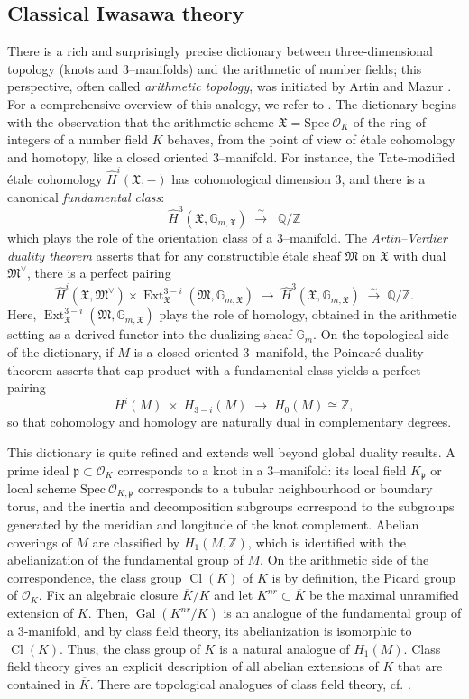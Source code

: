 \documentclass[table]{amsart}
\newcommand{\Z}{\mathbb{Z}}
\newcommand{\Q}{\mathbb{Q}}
\newcommand{\cO}{\mathcal{O}}
\newcommand{\Spec}{\mathrm{Spec}\ }
\newcommand{\op}[1]{\operatorname{#1}}
\numberwithin{equation}{section}
\begin{document}
\subsection{Classical Iwasawa theory}
There is a rich and surprisingly precise dictionary between three-dimensional topology (knots and $3$--manifolds) and the arithmetic of number fields; this perspective, often called \emph{arithmetic topology}, was initiated by Artin and Mazur \cite{ArtinMazur}. For a comprehensive overview of this analogy, we refer to \cite{morishita2011knots}. The dictionary begins with the observation that the arithmetic scheme $\mathfrak{X}=\Spec\cO_K$ of the ring of integers of a number field $K$ behaves, from the point of view of \'etale cohomology and homotopy, like a closed oriented $3$--manifold. For instance, the Tate-modified \'etale cohomology $\hat{H}^i(\mathfrak{X},-)$ has cohomological dimension $3$, and there is a canonical \emph{fundamental class}:
\[
\hat{H}^3(\mathfrak{X},\mathbb{G}_{m,\mathfrak X}) \;\xrightarrow{\;\sim\;}\;\; \Q/\Z
\]
which plays the role of the orientation class of a $3$--manifold. The \emph{Artin--Verdier duality theorem} asserts that for any constructible \'etale sheaf $\mathfrak M$ on $\mathfrak X$ with dual $\mathfrak M^\vee$, there is a perfect pairing
\[
\hat{H}^i(\mathfrak{X}, \mathfrak{M}^\vee)\times \op{Ext}_{\mathfrak{X}}^{3-i}(\mathfrak{M}, \mathbb{G}_{m, \mathfrak{X}})\;\longrightarrow\; \hat{H}^3(\mathfrak{X}, \mathbb{G}_{m, \mathfrak{X}})\;\xrightarrow{\sim}\;\Q/\Z.
\]
Here, $\op{Ext}_{\mathfrak{X}}^{3-i}(\mathfrak{M}, \mathbb{G}_{m,\mathfrak X})$ plays the role of homology, obtained in the arithmetic setting as a derived functor into the dualizing sheaf $\mathbb G_m$. On the topological side of the dictionary, if $M$ is a closed oriented $3$--manifold, the Poincar\'e duality theorem asserts that cap product with a fundamental class yields a perfect pairing
\[
H^i(M)\;\times\; H_{3-i}(M)\;\longrightarrow\; H_0(M)\cong \Z,
\]
so that cohomology and homology are naturally dual in complementary degrees.
\par This dictionary is quite refined and extends well beyond global duality results. A prime ideal $\mathfrak p\subset \cO_K$ corresponds to a knot in a $3$--manifold: its local field $K_{\mathfrak p}$ or local scheme $\Spec \cO_{K,\mathfrak p}$ corresponds to a tubular neighbourhood or boundary torus, and the inertia and decomposition subgroups correspond to the subgroups generated by the meridian and longitude of the knot complement. Abelian coverings of $M$ are classified by $H_1(M,\Z)$, which is identified with the abelianization of the fundamental group of $M$. On the arithmetic side of the correspondence, the class group $\op{Cl}(K)$ of $K$ is by definition, the Picard group of $\cO_K$. Fix an algebraic closure $\overline{K}/K$ and let $K^{nr}\subset \overline{K}$ be the maximal unramified extension of $K$. Then, $\op{Gal}(K^{nr}/K)$ is an analogue of the fundamental group of a $3$-manifold, and by class field theory, its abelianization is isomorphic to $\op{Cl}(K)$. Thus, the class group of $K$ is a natural analogue of $H_1(M)$. Class field theory gives an explicit description of all abelian extensions of $K$ that are contained in $\overline{K}$. There are topological analogues of class field theory, cf. \cite{Nibo, NiboUeki}.
\end{document}

